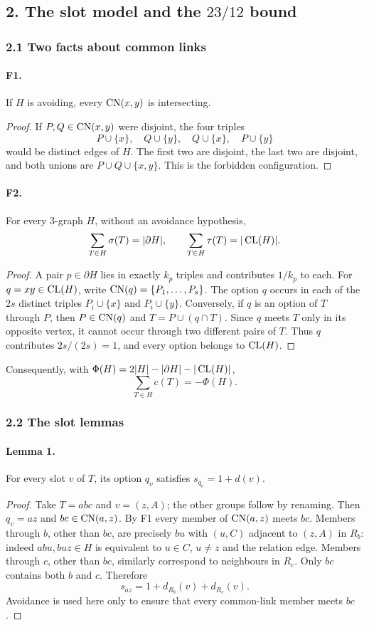 \subsection*{2. The slot model and the $23/12$ bound}
\subsubsection*{2.1 Two facts about common links}
\paragraph{F1.} If $H$ is avoiding, every $\operatorname{CN}(x,y)$ is intersecting.
\begin{proof}
If $P,Q\in\operatorname{CN}(x,y)$ were disjoint, the four triples
\[
 P\cup\{x\},\quad Q\cup\{y\},\quad Q\cup\{x\},\quad P\cup\{y\}
\]
would be distinct edges of $H$. The first two are disjoint, the last two are disjoint, and both unions are $P\cup Q\cup\{x,y\}$. This is the forbidden configuration.
\end{proof}
\paragraph{F2.} For every $3$-graph $H$, without an avoidance hypothesis,
\[
 \sum_{T\in H}\sigma(T)=|\partial H|,
 \qquad \sum_{T\in H}\tau(T)=|\operatorname{CL}(H)|.
\]
\begin{proof}
A pair $p\in\partial H$ lies in exactly $k_p$ triples and contributes $1/k_p$ to each. For $q=xy\in\operatorname{CL}(H)$, write $\operatorname{CN}(q)=\{P_1,\ldots,P_s\}$. The option $q$ occurs in each of the $2s$ distinct triples $P_i\cup\{x\}$ and $P_i\cup\{y\}$. Conversely, if $q$ is an option of $T$ through $P$, then $P\in\operatorname{CN}(q)$ and $T=P\cup(q\cap T)$. Since $q$ meets $T$ only in its opposite vertex, it cannot occur through two different pairs of $T$. Thus $q$ contributes $2s/(2s)=1$, and every option belongs to $\operatorname{CL}(H)$.
\end{proof}
Consequently, with $\Phi(H)=2|H|-|\partial H|-|\operatorname{CL}(H)|$,
\[
 \sum_{T\in H}c(T)=-\Phi(H).
\]
\subsubsection*{2.2 The slot lemmas}
\paragraph{Lemma 1.} For every slot $v$ of $T$, its option $q_v$ satisfies $s_{q_v}=1+d(v)$.
\begin{proof}
Take $T=abc$ and $v=(z,A)$; the other groups follow by renaming. Then $q_v=az$ and $bc\in\operatorname{CN}(a,z)$. By F1 every member of $\operatorname{CN}(a,z)$ meets $bc$. Members through $b$, other than $bc$, are precisely $bu$ with $(u,C)$ adjacent to $(z,A)$ in $R_b$: indeed $abu,buz\in H$ is equivalent to $u\in C$, $u\ne z$ and the relation edge. Members through $c$, other than $bc$, similarly correspond to neighbours in $R_c$. Only $bc$ contains both $b$ and $c$. Therefore
\[
 s_{az}=1+d_{R_b}(v)+d_{R_c}(v).
\]
Avoidance is used here only to ensure that every common-link member meets $bc$.
\end{proof}
